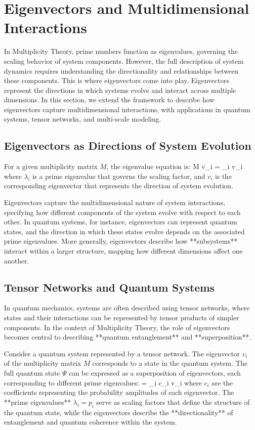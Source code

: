 \documentclass[12pt]{article}
\begin{document}
\section{Eigenvectors and Multidimensional Interactions}

In Multiplicity Theory, prime numbers function as eigenvalues, governing the scaling behavior of system components. However, the full description of system dynamics requires understanding the directionality and relationships between these components. This is where eigenvectors come into play. Eigenvectors represent the directions in which systems evolve and interact across multiple dimensions. In this section, we extend the framework to describe how eigenvectors capture multidimensional interactions, with applications in quantum systems, tensor networks, and multi-scale modeling.

\subsection{Eigenvectors as Directions of System Evolution}

For a given multiplicity matrix \( M \), the eigenvalue equation is:
\]
M$$ v_i = \lambda_i v_i
\]
where \( \lambda_i \) is a prime eigenvalue that governs the scaling factor, and \( v_i \) is the corresponding eigenvector that represents the direction of system evolution.

Eigenvectors capture the multidimensional nature of system interactions, specifying how different components of the system evolve with respect to each other. In quantum systems, for instance, eigenvectors can represent quantum states, and the direction in which these states evolve depends on the associated prime eigenvalues. More generally, eigenvectors describe how **subsystems** interact within a larger structure, mapping how different dimensions affect one another.

\subsection{Tensor Networks and Quantum Systems}

In quantum mechanics, systems are often described using tensor networks, where states and their interactions can be represented by tensor products of simpler components. In the context of Multiplicity Theory, the role of eigenvectors becomes central to describing **quantum entanglement** and **superposition**.

Consider a quantum system represented by a tensor network. The eigenvector \( v_i \) of the multiplicity matrix \( M \) corresponds to a state in the quantum system. The full quantum state \( \Psi \) can be expressed as a superposition of eigenvectors, each corresponding to different prime eigenvalues:
\]
\Psi = \sum_i c_i v_i
\]
where \( c_i \) are the coefficients representing the probability amplitudes of each eigenvector. The **prime eigenvalues** \( \lambda_i = p_i \) serve as scaling factors that define the structure of the quantum state, while the eigenvectors describe the **directionality** of entanglement and quantum coherence within the system.
\end{document}
